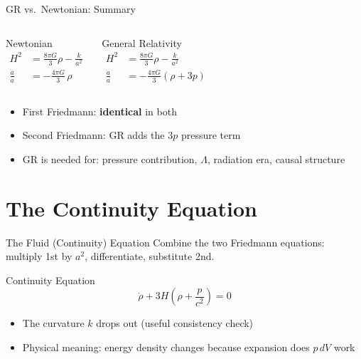 \documentclass[aspectratio=169,11pt]{beamer}
\begin{document}
\begin{frame}{GR vs.\ Newtonian: Summary}
\begin{columns}[T]
\begin{block}{Newtonian}
\begin{align*}
    H^2 &= \frac{8\pi G}{3}\rho - \frac{k}{a^2}\\[8pt]
    \frac{\ddot{a}}{a} &= -\frac{4\pi G}{3}\,\rho
\end{align*}
\end{block}

\begin{block}{General Relativity}
\begin{align*}
    H^2 &= \frac{8\pi G}{3}\rho - \frac{k}{a^2}\\[8pt]
    \frac{\ddot{a}}{a} &= -\frac{4\pi G}{3}(\rho+3p)
\end{align*}
\end{block}
\end{columns}

\vspace{0.4cm}
\begin{itemize}
    \item First Friedmann: \textbf{identical} in both
    \item Second Friedmann: GR adds the $3p$ pressure term
    \item GR is needed for: pressure contribution, $\Lambda$, radiation era, causal structure
\end{itemize}
\end{frame}


\section{The Continuity Equation}

\begin{frame}{The Fluid (Continuity) Equation}
Combine the two Friedmann equations: multiply 1st by $a^2$, differentiate, substitute 2nd.
\begin{alertblock}{Continuity Equation}
\begin{equation*}
    \dot{\rho} + 3H\!\left(\rho + \frac{p}{c^2}\right) = 0
\end{equation*}
\end{alertblock}
\begin{itemize}
    \item The curvature $k$ drops out (useful consistency check)
    \item Physical meaning: energy density changes because expansion does $p\,dV$ work
\end{itemize}
\end{frame}
\end{document}

